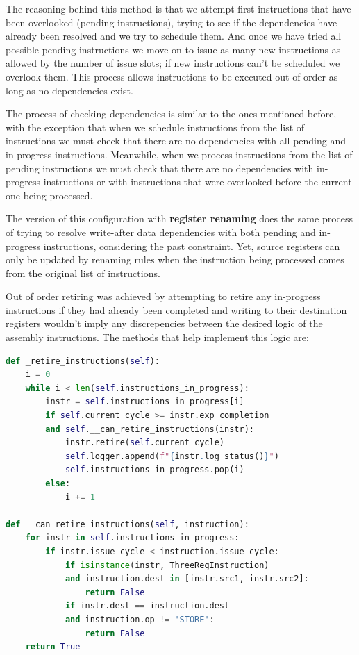 \documentclass{article}
\begin{document}
The reasoning behind this method is that we attempt first instructions that have been overlooked (pending instructions), trying to see if the dependencies have already been resolved and we try to schedule them. And once we have tried all possible pending instructions we move on to issue as many new instructions as allowed by the number of issue slots; if new instructions can't be scheduled we overlook them. This process allows instructions to be executed out of order as long as no dependencies exist.

The process of checking dependencies is similar to the ones mentioned before, with the exception that when we schedule instructions from the list of instructions we must check that there are no dependencies with all pending and in progress instructions. Meanwhile, when we process instructions from the list of pending instructions we must check that there are no dependencies with in-progress instructions or with instructions that were overlooked before the current one being processed. 

The version of this configuration with \textbf{register renaming} does the same process of trying to resolve write-after data dependencies with both pending and in-progress instructions, considering the past constraint. Yet, source registers can only be updated by renaming rules when the instruction being processed comes from the original list of instructions.

Out of order retiring was achieved by attempting to retire any in-progress instructions if they had already been completed and writing to their destination registers wouldn't imply any discrepencies between the desired logic of the assembly instructions. The methods that help implement this logic are:

\begin{lstlisting}[language=Python]
def _retire_instructions(self):
    i = 0 
    while i < len(self.instructions_in_progress):
        instr = self.instructions_in_progress[i]
        if self.current_cycle >= instr.exp_completion 
        and self.__can_retire_instructions(instr):
            instr.retire(self.current_cycle)
            self.logger.append(f"{instr.log_status()}")
            self.instructions_in_progress.pop(i)
        else:
            i += 1
    
def __can_retire_instructions(self, instruction):
    for instr in self.instructions_in_progress:
        if instr.issue_cycle < instruction.issue_cycle:
            if isinstance(instr, ThreeRegInstruction) 
            and instruction.dest in [instr.src1, instr.src2]:
                return False
            if instr.dest == instruction.dest
            and instruction.op != 'STORE':
                return False
    return True
\end{lstlisting}
\end{document}
